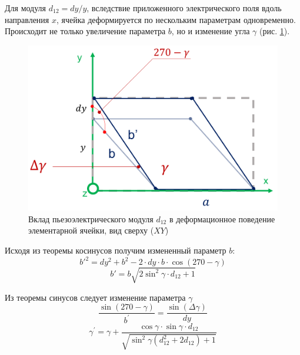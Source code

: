 Для модуля $d_{12} = dy/y$, вследствие приложенного электрического поля вдоль направления $x$,
ячейка деформируется по нескольким параметрам одновременно. Происходит не только увеличение
параметра $b$, но и изменение угла $\gamma$ (рис. \ref{ris:d12}).

\begin{figure}[H]
  \centering
  \includegraphics[width=.6\textwidth]{images/d12.png}
  \caption{Вклад пьезоэлектрического модуля $d_{12}$ в деформационное поведение элементарной ячейки, вид сверху ($XY$)}
  \label{ris:d12}
\end{figure}

Исходя из теоремы косинусов получим измененный параметр $b$:
\begin{equation}
   b'^2=dy^2+b^2-2 \cdot dy \cdot b \cdot \cos(270-\gamma) \nonumber
   \label{eq:b_formed_1}
\end{equation}
\begin{equation}
   b' = b \sqrt{ 2\sin^2 \gamma \cdot d_{12}+1}
   \label{eq:b_formed_2}
\end{equation}

Из теоремы синусов следует изменение параметра $\gamma$
\begin{equation}
   \frac{\sin(270-\gamma)}{b^{'}} = \frac{\sin (\Delta \gamma)}{dy} \nonumber
   \label{eq:b_formed_3}
\end{equation}
\begin{equation}
   \gamma^{'} = \gamma + \frac{\cos\gamma \cdot \sin \gamma \cdot d_{12}}{ \sqrt{ \sin^2 \gamma  (d_{12}^2 + 2d_{12})+1}}
   \label{eq:b_formed_4}
\end{equation}


